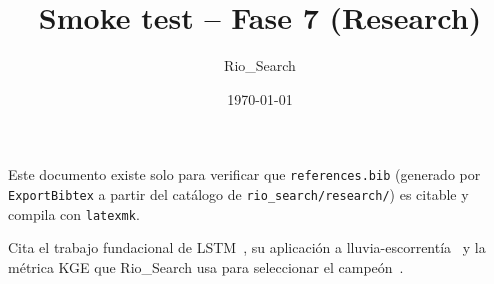 \documentclass{article}
\title{Smoke test -- Fase 7 (Research)}
\author{Rio\_Search}
\date{\today}
\begin{document}
\maketitle

Este documento existe solo para verificar que \texttt{references.bib} (generado por
\texttt{ExportBibtex} a partir del catálogo de \texttt{rio\_search/research/}) es citable y
compila con \texttt{latexmk}.

Cita el trabajo fundacional de LSTM~\cite{hochreiter-1997-lstm}, su aplicación a
lluvia-escorrentía~\cite{kratzert-2018-lstm-rainfall-runoff} y la métrica KGE que Rio\_Search usa
para seleccionar el campeón~\cite{gupta-2009-kge}.



\end{document}
